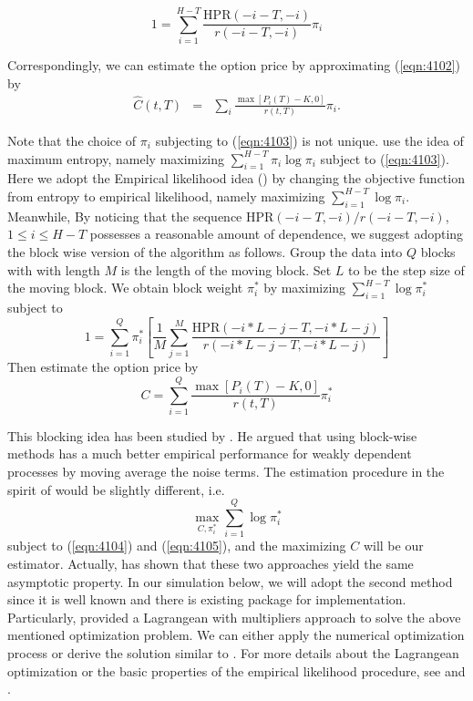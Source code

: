 \begin{equation}\label{eqn:4103}
1=\sum_{i=1}^{H-T} \frac{\mathrm{HPR}(-i-T,-i)}{r(-i-T,-i)}\pi_i
\end{equation}

Correspondingly, we can estimate the option price by approximating (\ref{eqn:4102}) by
\begin{eqnarray}
\hat{C}(t,T)&=& \sum_{i} \frac{\max[P_i(T)-K,0]}{r(t,T)}  \pi_i.
\end{eqnarray}

Note that the choice of $\pi_i$ subjecting to (\ref{eqn:4103}) is not unique. \citet{stutzer1996simple} use the idea of maximum entropy, namely maximizing $\sum^{H-T}_{i=1}\pi_i\log\pi_i$ subject to (\ref{eqn:4103}). Here we adopt the Empirical likelihood idea (\citet{owen1988empirical}) by changing the objective function from entropy to empirical likelihood, namely maximizing $\sum^{H-T}_{i=1}\log\pi_i$. Meanwhile, By noticing that the sequence $\mathrm{HPR}(-i-T,-i)/r(-i-T,-i)$, $1\leq i\leq H-T$ possesses a reasonable amount of dependence, we suggest  adopting the block wise version of the algorithm as follows. Group the data into $Q$ blocks with with length $M$ is the length of the moving block. Set $L$ to be the step size of the moving block. We obtain block weight $\pi^*_i$ by maximizing $\sum_{i=1}^{H-T} \log\pi_i^*$ subject to 
\begin{equation}\label{eqn:4104}
1=\sum_{i=1}^{Q} \pi^*_i \left[\frac{1}{M} \sum_{j=1}^M \frac{\mathrm{HPR}(-i*L-j-T, -i*L-j)}{r(-i*L-j-T, -i*L-j)}\right]
\end{equation} 
Then estimate the option price by 
\begin{equation}\label{eqn:4105}
C  =  \sum_{i=1}^Q \frac{\max[P_i(T)-K,0]}{r(t,T)}  \pi^*_i
\end{equation} 


This blocking idea has been studied by \citet{kitamura1997empirical}. He argued that using block-wise methods has a much better empirical performance for weakly dependent processes by moving average the noise terms. The estimation procedure in the spirit of \citet{kitamura1997empirical} would be slightly different, i.e. 
\begin{equation}
\max_{C, \pi_i^*} \sum_{i=1}^{Q} \log\pi_i^*
\end{equation}
subject to (\ref{eqn:4104}) and  (\ref{eqn:4105}), and the maximizing $C$ will be our estimator. Actually, \citet{peng2015class} has shown that these two approaches yield the same asymptotic property. In our simulation below, we will adopt the second method since it is well known and there is existing package for implementation. Particularly, \citet{qin1994empirical} provided a Lagrangean with multipliers approach to solve the above mentioned optimization problem. We can either apply the numerical optimization process or derive the solution similar to \citet{qin1994empirical}. For more details about the Lagrangean optimization or the basic properties of the empirical likelihood procedure, see \citet{owen1990empirical} and \citet{qin1994empirical}. 
  

